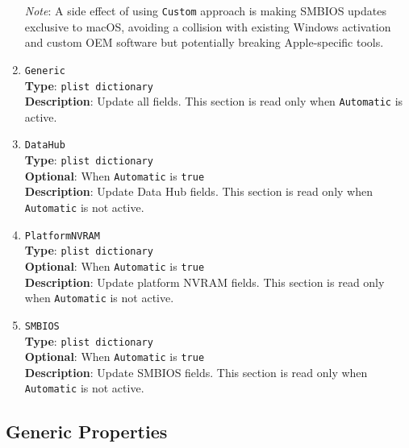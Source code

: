 \documentclass[]{article}
\begin{document}
\begin{enumerate}
  \emph{Note}: A side effect of using \texttt{Custom} approach is making
  SMBIOS updates exclusive to macOS, avoiding a collision with existing
  Windows activation and custom OEM software but potentially breaking
  Apple-specific tools.
\item
  \texttt{Generic}\\
  \textbf{Type}: \texttt{plist\ dictionary}\\
  \textbf{Description}: Update all fields. This section is read only
  when \texttt{Automatic} is active.
\item
  \texttt{DataHub}\\
  \textbf{Type}: \texttt{plist\ dictionary}\\
  \textbf{Optional}: When \texttt{Automatic} is \texttt{true}\\
  \textbf{Description}: Update Data Hub fields. This section is read
  only when \texttt{Automatic} is not active.
\item
  \texttt{PlatformNVRAM}\\
  \textbf{Type}: \texttt{plist\ dictionary}\\
  \textbf{Optional}: When \texttt{Automatic} is \texttt{true}\\
  \textbf{Description}: Update platform NVRAM fields. This section is
  read only when \texttt{Automatic} is not active.
\item
  \texttt{SMBIOS}\\
  \textbf{Type}: \texttt{plist\ dictionary}\\
  \textbf{Optional}: When \texttt{Automatic} is \texttt{true}\\
  \textbf{Description}: Update SMBIOS fields. This section is read only
  when \texttt{Automatic} is not active.
\end{enumerate}

\subsection{Generic Properties}\label{platforminfogeneric}
\end{document}

